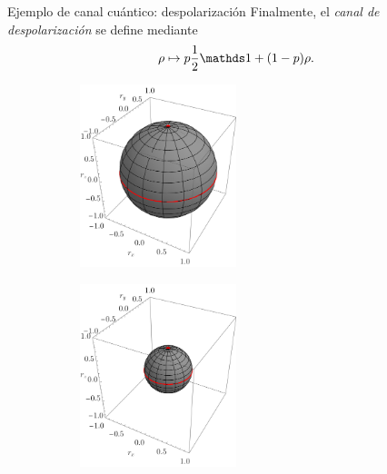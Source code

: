 \begin{frame}{Ejemplo de canal cuántico: despolarización}
    Finalmente, el \textit{canal de despolarización} se define mediante
    \begin{equation}
        \rho\mapsto p\frac{1}{2}\Id+(1-p)\rho\nonumber.
    \end{equation}
    \begin{figure}
        \centering
        \begin{subfigure}{0.45\textwidth}
            \centering
            \includegraphics[width=0.5\textwidth]{figures/whole_sphere.png}
        \end{subfigure}
        \begin{subfigure}{0.45\textwidth}
            \centering
            \includegraphics[width=0.5\textwidth]{figures/depol.png}
        \end{subfigure}
    \end{figure}
\end{frame}

